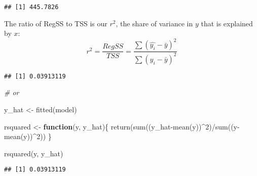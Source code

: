 \documentclass[
]{article}
\newenvironment{Shaded}{\begin{snugshade}}{\end{snugshade}}
\newcommand{\AttributeTok}[1]{\textcolor[rgb]{0.77,0.63,0.00}{#1}}
\newcommand{\CommentTok}[1]{\textcolor[rgb]{0.56,0.35,0.01}{\textit{#1}}}
\newcommand{\ControlFlowTok}[1]{\textcolor[rgb]{0.13,0.29,0.53}{\textbf{#1}}}
\newcommand{\DecValTok}[1]{\textcolor[rgb]{0.00,0.00,0.81}{#1}}
\newcommand{\FunctionTok}[1]{\textcolor[rgb]{0.00,0.00,0.00}{#1}}
\newcommand{\NormalTok}[1]{#1}
\newcommand{\OtherTok}[1]{\textcolor[rgb]{0.56,0.35,0.01}{#1}}
\newcommand{\SpecialCharTok}[1]{\textcolor[rgb]{0.00,0.00,0.00}{#1}}
\begin{document}
\begin{verbatim}
## [1] 445.7826
\end{verbatim}

The ratio of RegSS to TSS is our \(r^2\), the share of variance in \(y\)
that is explained by \(x\):
\[r^2=\frac{RegSS}{TSS}=\frac{\sum(\hat{y_i}-\bar{y})^2}{\sum(y_i-\bar{y})^2}\]

\begin{Shaded}
\end{Shaded}

\begin{verbatim}
## [1] 0.03913119
\end{verbatim}

\begin{Shaded}
\begin{Highlighting}[]
\CommentTok{\# or}

\NormalTok{y\_hat }\OtherTok{\textless{}{-}} \FunctionTok{fitted}\NormalTok{(model)}

\NormalTok{rsquared }\OtherTok{\textless{}{-}} \ControlFlowTok{function}\NormalTok{(y, y\_hat)\{}
  \FunctionTok{return}\NormalTok{(}\FunctionTok{sum}\NormalTok{((y\_hat}\SpecialCharTok{{-}}\FunctionTok{mean}\NormalTok{(y))}\SpecialCharTok{\^{}}\DecValTok{2}\NormalTok{)}\SpecialCharTok{/}\FunctionTok{sum}\NormalTok{((y}\SpecialCharTok{{-}}\FunctionTok{mean}\NormalTok{(y))}\SpecialCharTok{\^{}}\DecValTok{2}\NormalTok{))}
\NormalTok{\}}

\FunctionTok{rsquared}\NormalTok{(y, y\_hat)}
\end{Highlighting}
\end{Shaded}

\begin{verbatim}
## [1] 0.03913119
\end{verbatim}
\end{document}
